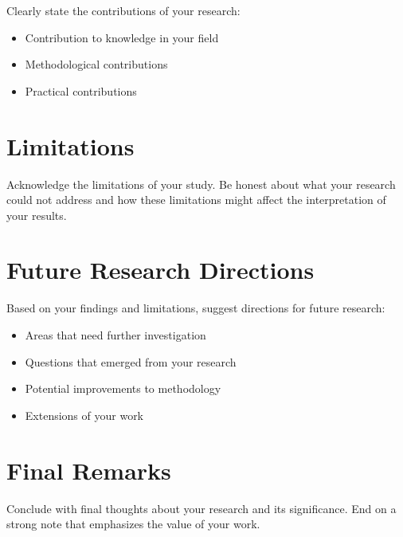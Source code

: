 Clearly state the contributions of your research:
\begin{itemize}
    \item Contribution to knowledge in your field
    \item Methodological contributions
    \item Practical contributions
\end{itemize}

\section{Limitations}

Acknowledge the limitations of your study. Be honest about what your research could not address and how these limitations might affect the interpretation of your results.

\section{Future Research Directions}

Based on your findings and limitations, suggest directions for future research:
\begin{itemize}
    \item Areas that need further investigation
    \item Questions that emerged from your research
    \item Potential improvements to methodology
    \item Extensions of your work
\end{itemize}

\section{Final Remarks}

Conclude with final thoughts about your research and its significance. End on a strong note that emphasizes the value of your work.

